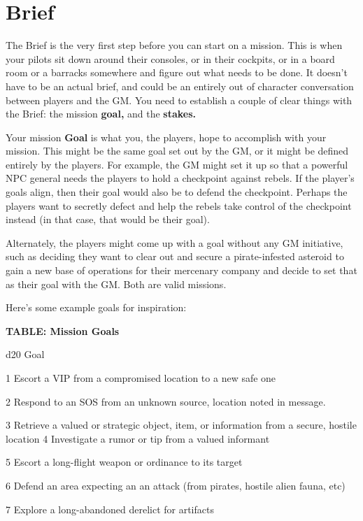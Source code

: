\section{Brief}

The Brief is the very first step before you can start on a mission. This is when your pilots sit down around their consoles, or in their cockpits, or in a board room or a barracks somewhere and figure out what needs to be done. It doesn’t have to be an actual brief, and could be an entirely out of character conversation between players and the GM. You need to establish a couple of clear things with the Brief: the mission \textbf{goal,} and the \textbf{stakes.} 

Your mission \textbf{Goal} is what you, the players, hope to accomplish with your mission. This might be
the same goal set out by the GM, or it might be defined entirely by the players. For example, the
GM might set it up so that a powerful NPC general needs the players to hold a checkpoint
against rebels. If the player’s goals align, then their goal would also be to defend the checkpoint.
Perhaps the players want to secretly defect and help the rebels take control of the checkpoint
instead (in that case, that would be their goal).

Alternately, the players might come up with a goal without any GM initiative, such as deciding
they want to clear out and secure a pirate-infested asteroid to gain a new base of operations for
their mercenary company and decide to set that as their goal with the GM. Both are valid
missions.

Here’s some example goals for inspiration:

\textbf{TABLE: Mission Goals}

 d20       Goal

 1         Escort a VIP from a compromised location to a new safe one

 2         Respond to an SOS from an unknown source, location noted in message.

 3         Retrieve a valued or strategic object, item, or information from a secure, hostile
           location
 4         Investigate a rumor or tip from a valued informant

 5         Escort a long-flight weapon or ordinance to its target

 6         Defend an area expecting an an attack (from pirates, hostile alien fauna, etc)

 7         Explore a long-abandoned derelict for artifacts

